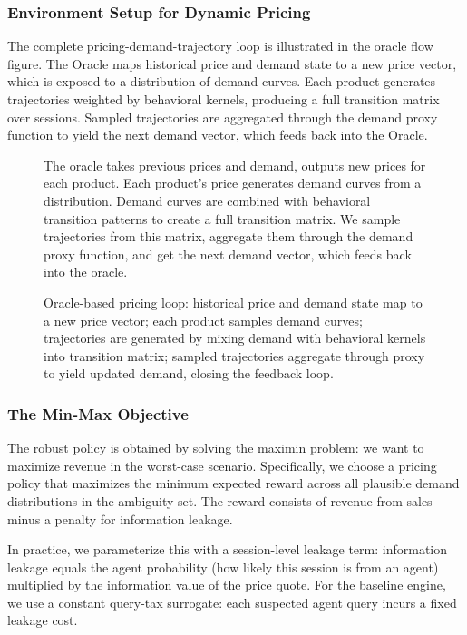 \subsubsection{Environment Setup for Dynamic Pricing}

The complete pricing-demand-trajectory loop is illustrated in the oracle flow figure. The Oracle maps historical price and demand state to a new price vector, which is exposed to a distribution of demand curves. Each product generates trajectories weighted by behavioral kernels, producing a full transition matrix over sessions. Sampled trajectories are aggregated through the demand proxy function to yield the next demand vector, which feeds back into the Oracle.

\begin{figure}[ht]
\centering
The oracle takes previous prices and demand, outputs new prices for each product. Each product's price generates demand curves from a distribution. Demand curves are combined with behavioral transition patterns to create a full transition matrix. We sample trajectories from this matrix, aggregate them through the demand proxy function, and get the next demand vector, which feeds back into the oracle.
\caption{Oracle-based pricing loop: historical price and demand state map to a new price vector; each product samples demand curves; trajectories are generated by mixing demand with behavioral kernels into transition matrix; sampled trajectories aggregate through proxy to yield updated demand, closing the feedback loop.}
\label{fig:oracle_flow}
\end{figure}

\subsubsection{The Min-Max Objective}

The robust policy is obtained by solving the maximin problem: we want to maximize revenue in the worst-case scenario. Specifically, we choose a pricing policy that maximizes the minimum expected reward across all plausible demand distributions in the ambiguity set. The reward consists of revenue from sales minus a penalty for information leakage.

In practice, we parameterize this with a session-level leakage term: information leakage equals the agent probability (how likely this session is from an agent) multiplied by the information value of the price quote. For the baseline engine, we use a constant query-tax surrogate: each suspected agent query incurs a fixed leakage cost.

